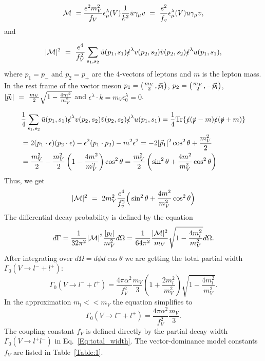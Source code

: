 \documentclass[prd,onecolumn,showpcs,amsmath,amssymb,nofootinbib,notitlepage,preprintnumbers,balancelastpage,longbibliography]{revtex4-2}
\newcommand{\baru}{{\bar u}}
\newcommand{\barv}{{\bar v}}
\newcommand{\beq}{\begin{equation}}
\newcommand{\eeq}{\end{equation}}
\begin{document}
\begin{equation}
{\cal M}~={e^2 m_V^2\over f_V} \epsilon^\lambda_\mu(V){1\over k^2}\bar u \gamma_\mu v~=~{e^2\over f_v}\epsilon^\lambda_\mu(V)\bar u\gamma_\mu v,
\end{equation}
\noindent
and 

\begin{equation}
|{\cal M}|^2~=~{e^4\over f_V^2}\sum_{s_1,s_2}\bar u(p_1,s_1)\slashed{\epsilon}^\lambda v(p_2,s_2)\bar v(p_2,s_2)\slashed{\epsilon}^\lambda u(p_1,s_1),
\end{equation}
\noindent
where $p_1=p_-$ and $p_2=p_+$ are the 4-vectors of leptons and $m$ is the lepton mass.  
In the rest frame of the vector meson $p_1=\big({m_V\over 2},\vec{p}_l\big)$, $p_2=\big({m_V\over 2},-\vec{p}_l\big)$, 
$|\vec{p}_l|~=~{m_V\over 2}\sqrt{1-{4m^2\over m_V^2}}$ and $\epsilon^\lambda\cdot k=m_V\epsilon^\lambda_0=0$.

\begin{equation}
\begin{split}
& \frac{1}{4}\sum_{s_1,s_2}\baru(p_1,s_1)\slashed{\epsilon}^\lambda v(p_2,s_2)\barv(p_2,s_2)\slashed{\epsilon}^\lambda u(p_1,s_1) 
= \frac{1}{4}{\rm Tr}\{\slashed{\epsilon}(\slashed{p} - m)\slashed{\epsilon}(\slashed{p} + m)\} \\
&= 2(p_1 \cdot \epsilon)(p_2 \cdot \epsilon) - \epsilon^2(p_1 \cdot p_2) - m^2 \epsilon^2 
= -2|\vec{p}_1|^2\cos^2{\theta} + \frac{m_V^2}{2} \\
&= \frac{m_V^2}{2} - \frac{m_V^2}{2} \left(1 - \frac{4m^2}{m_V^2}\right) \cos^2{\theta} 
= \frac{m_V^2}{2} \left(\sin^2{\theta} + \frac{4m^2}{m_V^2} \cos^2{\theta}\right)
\end{split}
\end{equation}
Thus, we get
%
\beq
|{\cal M}|^2~=~2m_V^2{e^4\over f_v^2}\Big(\sin^2{\theta}+\frac{4m^2}{m_V^2} \cos^2{\theta}\Big)
\label{Eq:M2}
\eeq
\noindent
The differential decay probability is defined by the equation
\begin{equation}
 d\Gamma=\frac{1}{32\pi^2} | {\cal M}|^2 \frac{|p_l|}{m_V^2}d\Omega = \frac{1}{64\pi^2}\frac{ |{\cal M}|^2}{m_V}\sqrt{1-\frac{4m_l^2}{m_V^2}} d\Omega.
 \end{equation}
\noindent
 After integrating over $d\Omega=d\phi d\cos{\theta}$ we are getting the total partial width $\Gamma_0(V\to l^-+l^+)$:
\begin{equation}
\Gamma_0(V\to l^-+l^+)=\frac{4\pi\alpha^2}{f_V^2}\frac{m_V}{3} \left(1+\frac{2m_l^2}{m_V^2}\right) \sqrt{1-\frac{4m_l^2}{m_V^2}}.
\end{equation}
\noindent
In the approximation $m_l<<m_V$ the equation simplifies to
\begin{equation}
\Gamma_0(V\to l^-+l^+)=\frac{4\pi\alpha^2}{f_V^2}\frac{m_V}{3}.
\label{Eq:total_width}
\end{equation}
\noindent
The coupling constant $f_V$ is defined directly by the partial decay width $\Gamma_0(V \to l^+l^-)$ in Eq.~\ref{Eq:total_width}.
The vector-dominance model constants $f_V$ are listed in Table~\ref{Table:1}.
\end{document}

